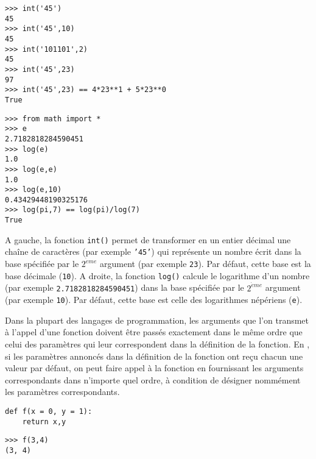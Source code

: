 \noindent\mbox{}\hspace*{1cm}\begin{py}{6cm}
\begin{verbatim}
>>> int('45')
45
>>> int('45',10)
45
>>> int('101101',2)
45
>>> int('45',23)
97
>>> int('45',23) == 4*23**1 + 5*23**0
True
\end{verbatim}
\end{py}
\hfill
\begin{py}{6cm}
\begin{verbatim}
>>> from math import *
>>> e
2.7182818284590451
>>> log(e)
1.0
>>> log(e,e)
1.0
>>> log(e,10)
0.43429448190325176
>>> log(pi,7) == log(pi)/log(7)
True
\end{verbatim}
\end{py}
\hspace*{1cm}\mbox{}\vspace*{2mm}

\noindent A gauche, la fonction {\tt int()} permet de transformer en un entier décimal
une chaîne de caractères (par exemple {\tt '45'}) qui représente un nombre écrit dans la 
base spécifiée par le $2^{\grave eme}$ argument (par exemple {\tt 23}). Par défaut, cette
base est la base décimale ({\tt 10}). A droite, la fonction {\tt log()} calcule le logarithme
d'un nombre (par exemple {\tt 2.7182818284590451}) dans la base spécifiée par le 
$2^{\grave eme}$ argument (par exemple {\tt 10}). Par défaut, cette base est celle
des logarithmes népériens ({\tt e}).

Dans la plupart des langages de programmation, les arguments que l'on transmet à l'appel
d'une fonction doivent être passés exactement dans le même ordre que celui des paramètres qui
leur correspondent dans la définition de la fonction.
En \python, si les paramètres annoncés dans
la définition de la fonction ont reçu chacun une valeur par défaut,
on peut faire appel à la fonction en fournissant les arguments 
correspondants dans n'importe quel ordre, à condition de désigner nommément 
les paramètres correspondants. 

\noindent\mbox{}\hspace*{1cm}\begin{py}{6cm}
\begin{verbatim}
def f(x = 0, y = 1):
    return x,y
\end{verbatim}
\end{py}
\hfill
\begin{py}{6cm}
\begin{verbatim}
>>> f(3,4)
(3, 4)
\end{verbatim}
\end{py}

